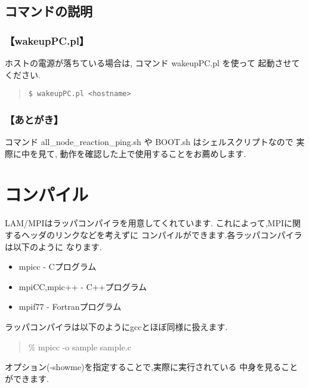 \documentclass[a4paper,titlepage]{jreport}
\begin{document}
\subsection{コマンドの説明}

\subsubsection{【wakeupPC.pl】}

ホストの電源が落ちている場合は, コマンド wakeupPC.pl を使って
起動させてください.

\begin{quote}
\begin{screen}
\begin{verbatim}
$ wakeupPC.pl <hostname>
\end{verbatim}
\end{screen}
\end{quote}

\subsubsection{【あとがき】}
コマンド all\_node\_reaction\_ping.sh や BOOT.sh はシェルスクリプトなので
実際に中を見て, 動作を確認した上で使用することをお薦めします. 

\newpage

\section{コンパイル}
LAM/MPIはラッパコンパイラを用意してくれています.
これによって,MPIに関するヘッダのリンクなどを考えずに
コンパイルができます.各ラッパコンパイラは以下のように
なります.

\begin{itemize}
\item mpicc - Cプログラム
\item mpiCC,mpic++ - C++プログラム
\item mpif77 - Fortranプログラム
\end{itemize}

ラッパコンパイラは以下のようにgccとほぼ同様に扱えます.

\begin{quote}
\begin{screen}
\% mpicc -o sample sample.c
\end{screen}
\end{quote}

オプション(-showme)を指定することで,実際に実行されている
中身を見ることができます.
\end{document}

